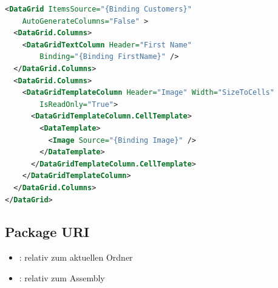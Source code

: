 \begin{lstlisting}[language=xml]
<DataGrid ItemsSource="{Binding Customers}"
    AutoGenerateColumns="False" >
  <DataGrid.Columns>
    <DataGridTextColumn Header="First Name" 
        Binding="{Binding FirstName}" />
  </DataGrid.Columns>
  <DataGrid.Columns>
    <DataGridTemplateColumn Header="Image" Width="SizeToCells" 
        IsReadOnly="True">
      <DataGridTemplateColumn.CellTemplate>
        <DataTemplate>
          <Image Source="{Binding Image}" />
        </DataTemplate>
      </DataGridTemplateColumn.CellTemplate>
    </DataGridTemplateColumn>
  </DataGrid.Columns>
</DataGrid>
\end{lstlisting}

\subsection{Package URI}
\begin{itemize}
    \item {}: relativ zum aktuellen Ordner
    \item {}: relativ zum Assembly
\end{itemize}



